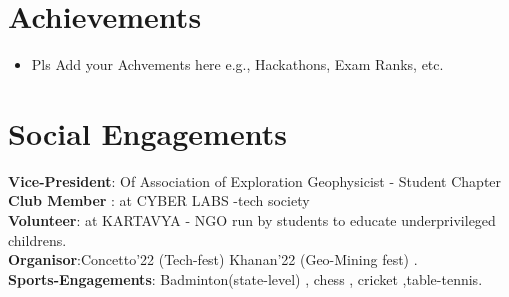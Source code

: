 \documentclass[letterpaper,11pt]{article}
\begin{document}
\section{Achievements}
\begin{itemize} %
    \item Pls Add your Achvements here e.g., Hackathons, Exam Ranks, etc.
\end{itemize} %


\section{Social Engagements}
    \begin{itemize}[leftmargin=0.15in, label={}]
	\small{\item{
		\textbf{Vice-President}{: Of Association of Exploration Geophysicist - Student Chapter} \\
		\textbf{Club Member}{ : at CYBER LABS -tech society} \\
		\textbf{Volunteer}{: at KARTAVYA - NGO run by students to educate underprivileged childrens.} \\
  		\textbf{Organisor}{:Concetto'22 (Tech-fest)  Khanan'22 (Geo-Mining fest) .} \\
        \textbf{Sports-Engagements}{: Badminton(state-level) , chess , cricket ,table-tennis.}
	}}
    \end{itemize}


\end{document}
